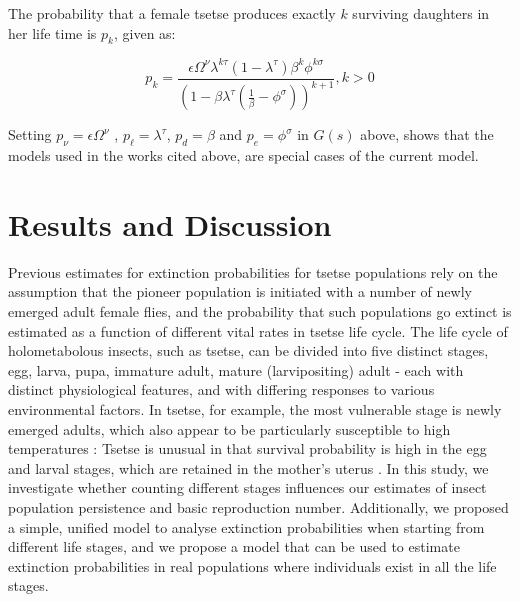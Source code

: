 \documentclass[smallextended]{svjour3}
\begin{document}
The probability that a female tsetse produces exactly $k$ surviving daughters in her life time is $p_{k}$, given as:

\begin{equation}
	\label{Johnframework}
	p_{k}= \frac{\epsilon \Omega^{\nu}\lambda^{k\tau}(1-\lambda^{\tau})\beta^{k}\phi^{k\sigma}}{(1-\beta \lambda^\tau(\frac{1}{\beta} -\phi^{\sigma}))^{k+1}},   k>0   
\end{equation}

Setting  $ p_{\nu}= \epsilon \Omega^{\nu}$ , $p_{\ell} =\lambda^{\tau} $, $p_{d}=\beta$  and $p_{e} = \phi^{\sigma} $ in  $G(s)$ above,   shows that the models used in the works cited above, are special cases of the current model. 

\section{Results and Discussion}
\label{section8}

Previous estimates for extinction probabilities for tsetse populations rely on the assumption that the pioneer population is initiated with a number of newly emerged adult female flies, and the probability that such populations go extinct is estimated as a function of different vital rates in tsetse life cycle. The life cycle of holometabolous insects, such as tsetse, can be divided into five distinct stages, egg, larva, pupa, immature adult, mature (larvipositing) adult - each with distinct physiological features, and with differing responses to various environmental factors. In tsetse, for example, the most vulnerable stage is newly emerged adults, which also appear to be particularly susceptible to high temperatures \cite{Ackley2017a}: Tsetse is unusual in that survival probability is high in the egg and larval stages, which are retained in the mother's uterus \cite{Hargrove1999a}. In this study, we investigate whether counting different stages influences our estimates of insect population persistence and basic reproduction number. Additionally, we proposed a simple, unified model to analyse extinction probabilities when starting from different life stages, and we propose a model that can be used to estimate extinction probabilities in real populations where individuals exist in all the life stages. 
\end{document}

